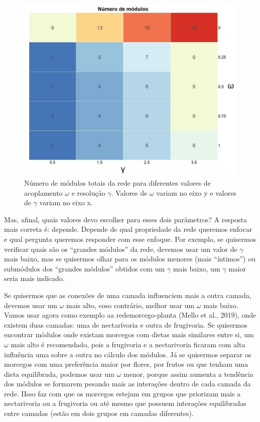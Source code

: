 \documentclass[
  12pt,
]{article}
\begin{document}
\begin{figure}[h!]
    \centering
    \includegraphics[width=1\textwidth]{./Figuras/Mosaico_numero_de_modulos_edit.png}
    \caption{Número de módulos totais da rede para diferentes valores de acoplamento $\omega$ e resolução $\gamma$. Valores de $\omega$ variam no eixo y e valores de $\gamma$ variam no eixo x.}
    \label{fig:Mosaico2}
\end{figure}

\pagebreak

Mas, afinal, quais valores devo escolher para esses dois parâmetros? A
resposta mais correta é: depende. Depende de qual propriedade da rede
queremos enfocar e qual pergunta queremos responder com esse enfoque.
Por exemplo, se quisermos verificar quais são os ``grandes módulos'' da
rede, devemos usar um valor de \(\gamma\) mais baixo, mas se quisermos
olhar para os módulos menores (mais ``íntimos'') ou submódulos dos
``grandes módulos'' obtidos com um \(\gamma\) mais baixo, um \(\gamma\)
maior seria mais indicado.

Se quisermos que as conexões de uma camada influenciem mais a outra
camada, devemos usar um \(\omega\) mais alto, coso contrário, melhor
usar um \(\omega\) mais baixo. Vamos usar agora como exemplo aa
redemorcego-planta (Mello et al., 2019), onde existem duas camadas: uma
de nectarívoria e outra de frugivoria. Se quisermos encontrar módulos
onde existam morcegos com dietas mais similares entre si, um \(\omega\)
mais alto é recomendado, pois a frugivoria e a nectarivoria ficaram com
alta influência uma sobre a outra no cálculo dos módulos. Já se
quisermos separar os morcegos com uma preferência maior por flores, por
frutos ou que tenham uma dieta equilibrada, podemos usar um \(\omega\)
menor, porque assim aumenta a tendência dos módulos se formarem pesando
mais as interações dentro de cada camada da rede. IIsso faz com que os
morcegos estejam em grupos que priorizam mais a nectarivoria ou a
frugivoria ou até mesmo que possuem interações equilibradas entre
camadas (estão em dois grupos em camadas diferentes).
\end{document}

